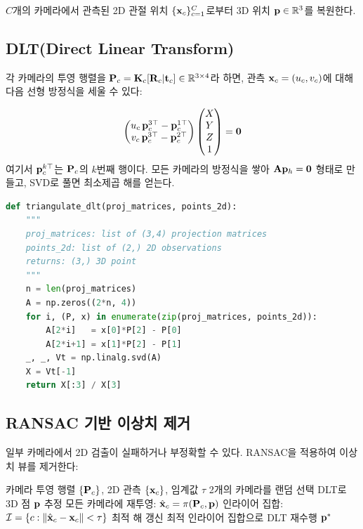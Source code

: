 \documentclass[11pt, a4paper]{report}
\begin{document}
$C$개의 카메라에서 관측된 2D 관절 위치 $\{\mathbf{x}_c\}_{c=1}^{C}$로부터
3D 위치 $\mathbf{p} \in \mathbb{R}^3$를 복원한다.

\subsection{DLT(Direct Linear Transform)}

각 카메라의 투영 행렬을 $\mathbf{P}_c = \mathbf{K}_c[\mathbf{R}_c | \mathbf{t}_c] \in \mathbb{R}^{3 \times 4}$라 하면,
관측 $\mathbf{x}_c = (u_c, v_c)$에 대해 다음 선형 방정식을 세울 수 있다:

\begin{equation}
\begin{pmatrix}
u_c \, \mathbf{p}_c^{3\top} - \mathbf{p}_c^{1\top} \\
v_c \, \mathbf{p}_c^{3\top} - \mathbf{p}_c^{2\top}
\end{pmatrix}
\begin{pmatrix} X \\ Y \\ Z \\ 1 \end{pmatrix} = \mathbf{0}
\end{equation}
여기서 $\mathbf{p}_c^{k\top}$는 $\mathbf{P}_c$의 $k$번째 행이다.
모든 카메라의 방정식을 쌓아 $\mathbf{A}\mathbf{p}_h = \mathbf{0}$ 형태로 만들고,
SVD로 풀면 최소제곱 해를 얻는다.

\begin{codebox}[title={DLT 삼각측량 구현}]
\begin{lstlisting}[language=Python]
def triangulate_dlt(proj_matrices, points_2d):
    """
    proj_matrices: list of (3,4) projection matrices
    points_2d: list of (2,) 2D observations
    returns: (3,) 3D point
    """
    n = len(proj_matrices)
    A = np.zeros((2*n, 4))
    for i, (P, x) in enumerate(zip(proj_matrices, points_2d)):
        A[2*i]   = x[0]*P[2] - P[0]
        A[2*i+1] = x[1]*P[2] - P[1]
    _, _, Vt = np.linalg.svd(A)
    X = Vt[-1]
    return X[:3] / X[3]
\end{lstlisting}
\end{codebox}

\subsection{RANSAC 기반 이상치 제거}

일부 카메라에서 2D 검출이 실패하거나 부정확할 수 있다.
RANSAC을 적용하여 이상치 뷰를 제거한다:

\begin{algorithm}[H]
\caption{RANSAC 삼각측량}
\begin{algorithmic}[1]
\REQUIRE 카메라 투영 행렬 $\{\mathbf{P}_c\}$, 2D 관측 $\{\mathbf{x}_c\}$, 임계값 $\tau$
  \STATE 2개의 카메라를 랜덤 선택
  \STATE DLT로 3D 점 $\mathbf{p}$ 추정
  \STATE 모든 카메라에 재투영: $\hat{\mathbf{x}}_c = \pi(\mathbf{P}_c, \mathbf{p})$
  \STATE 인라이어 집합: $\mathcal{I} = \{c : \|\hat{\mathbf{x}}_c - \mathbf{x}_c\| < \tau\}$
    \STATE 최적 해 갱신
  \ENDIF
\ENDFOR
\STATE 최적 인라이어 집합으로 DLT 재수행
\RETURN $\mathbf{p}^*$
\end{algorithmic}
\end{algorithm}
\end{document}
